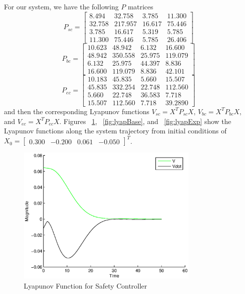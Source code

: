 \documentclass[conference]{IEEEtran}
\begin{document}
For our system, we have the following $P$ matrices 
\begin{equation}
P_{sc}=\left[ \begin{array}{cccc} 8.494 & 32.758 & 3.785  & 11.300 \\ 32.758 & 217.957  & 16.617  & 75.446 \\ 3.785  & 16.617   & 5.319   & 5.785 \\ 11.300  & 75.446   & 5.785  & 26.406 \end{array} \right]
\label{eq:lyapSafeP}
\end{equation}
\begin{equation}
P_{bc}=\left[\begin{array}{cccc} 10.623 &  48.942 &    6.132 &   16.600 \\ 48.942 &  350.558 &   25.975 &  119.079 \\
6.132 &   25.975 &   44.397 &    8.836 \\ 16.600 & 119.079 &   8.836 &   42.101\end{array}\right]
\label{eq:lyapBaseP}
\end{equation}
\begin{equation}
P_{ec}=\left[\begin{array}{cccc} 10.183 &   45.835 &    5.660 &   15.507 \\45.835 &  332.254 &   22.748 &  112.560 \\ 5.660 &   22.748 &   36.583 &    7.718 \\ 15.507 &  112.560 &    7.718 &   39.2890\end{array}\right]
\label{eq:lyapExpP}
\end{equation}
and then the corresponding Lyapunov functions $V_{sc}=X^TP_{sc}X$, $V_{bc}=X^TP_{bc}X$, and $V_{ec}=X^TP_{ec}X$.  Figures ~\ref{fig:lyapSafe}, ~\ref{fig:lyapBase}, and ~\ref{fig:lyapExp} show the Lyapunov functions along the system trajectory from initial conditions of $X_{0}=\left[\begin{array}{cccc} 0.300 & -0.200 & 0.061 & -0.050 \end{array}\right]^T$.

\begin{figure}[htp]
\centering
\includegraphics[width=250pt]{lyapSafe}
\caption{Lyapunov Function for Safety Controller}\label{fig:lyapSafe}
\end{figure}
\end{document}
